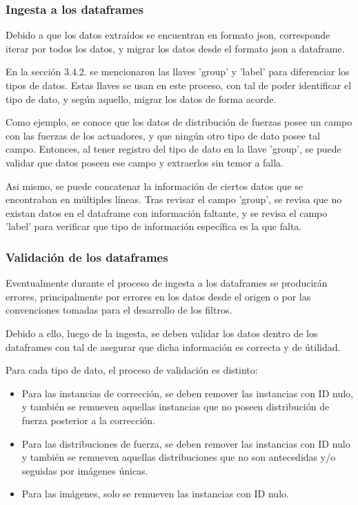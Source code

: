 \subsubsection{Ingesta a los dataframes}

Debido a que los datos extraídos se encuentran en formato json, corresponde iterar por todos los datos, y migrar los datos desde el formato json a dataframe.

En la sección 3.4.2. se mencionaron las llaves 'group' y 'label' para diferenciar los tipos de datos. Estas llaves se usan en este proceso, con tal de poder identificar el tipo de dato, y según aquello, migrar los datos de forma acorde.

Como ejemplo, se conoce que los datos de distribución de fuerzas posee un campo con las fuerzas de los actuadores, y que ningún otro tipo de dato posee tal campo. Entonces, al tener registro del tipo de dato en la llave 'group', se puede validar que datos poseen ese campo y extraerlos sin temor a falla.

Asi mismo, se puede concatenar la información de ciertos datos que se encontraban en múltiples líneas. Tras revisar el campo 'group', se revisa que no existan datos en el dataframe con información faltante, y se revisa el campo 'label' para verificar que tipo de información específica es la que falta.

\subsubsection{Validación de los dataframes}

Eventualmente durante el proceso de ingesta a los dataframes se producirán errores, principalmente por errores en los datos desde el origen o por las convenciones tomadas para el desarrollo de los filtros.

Debido a ello, luego de la ingesta, se deben validar los datos dentro de los dataframes con tal de asegurar que dicha información es correcta y de útilidad.

Para cada tipo de dato, el proceso de validación es distinto:

\begin{itemize}
    \item Para las instancias de corrección, se deben remover las instancias con ID nulo, y también se remueven aquellas instancias que no poseen distribución de fuerza posterior a la corrección.

    \item Para las distribuciones de fuerza, se deben remover las instancias con ID nulo y también se remueven aquellas distribuciones que no son antecedidas y/o seguidas por imágenes únicas.

    \item Para las imágenes, solo se remueven las instancias con ID nulo.
\end{itemize}

